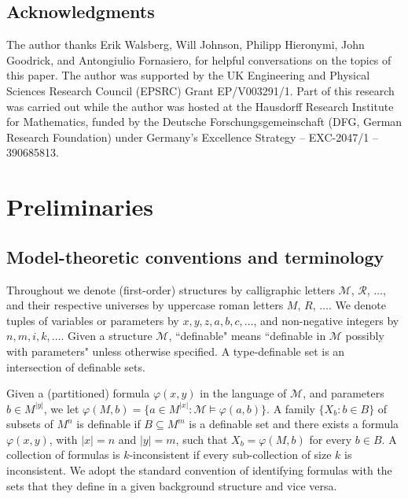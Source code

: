 \documentclass[12pt]{article}
\newcommand{\Mm}{\mathcal{M}}
\newcommand{\Rr}{\mathcal{R}}
\theoremstyle{definition}
\theoremstyle{remark}
\begin{document}
\subsection*{Acknowledgments}

The author thanks Erik Walsberg, Will Johnson, Philipp Hieronymi, John Goodrick, and Antongiulio Fornasiero, for helpful conversations on the topics of this paper. The author was supported by the UK Engineering and Physical Sciences Research Council (EPSRC) Grant EP/V003291/1. Part of this research was carried out while the author was hosted at the Hausdorff Research Institute for Mathematics, funded by the Deutsche Forschungsgemeinschaft (DFG, German Research Foundation) under Germany's Excellence Strategy – EXC-2047/1 – 390685813. 



\section{Preliminaries} \label{sec:prelim}

\subsection{Model-theoretic conventions and terminology}

Throughout we denote (first-order) structures by calligraphic letters $\Mm$, $\Rr$, $\ldots$, and their respective universes by uppercase roman letters $M$, $R$, $\ldots$. We denote tuples of variables or parameters by $x,y, z, a, b, c,\ldots$, and non-negative integers by $n, m, i, k, \ldots$. Given a structure $\Mm$, ``definable" means ``definable in $\Mm$ possibly with parameters" unless otherwise specified. A type-definable set is an intersection of definable sets. 

Given a (partitioned) formula $\varphi(x,y)$ in the language of $\Mm$, and parameters $b\in M^{|y|}$, we let $\varphi(M,b)=\{ a\in M^{|x|} : \Mm\models \varphi(a,b)\}$. A family $\{X_b : b\in B\}$ of subsets of $M^n$ is definable if $B\subseteq M^m$ is a definable set and there exists a formula $\varphi(x,y)$, with $|x|=n$ and $|y|=m$, such that $X_b=\varphi(M,b)$ for every $b\in B$. 
A collection of formulas is $k$-inconsistent if every sub-collection of size $k$ is inconsistent. We adopt the standard convention of identifying formulas with the sets that they define in a given background structure and vice versa.
\end{document}

